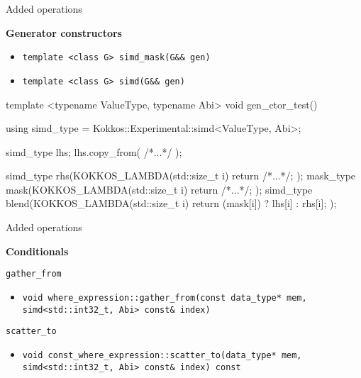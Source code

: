 
\begin{frame}[fragile]{Added operations}

\textbf{Generator constructors}
\begin{itemize}
  \item \texttt{template <class G> simd\_mask(G\&\& gen)}
  \item \texttt{template <class G> simd(G\&\& gen)}
\end{itemize}
\bigskip
\begin{code}[keywords={GeneratorConstructors}]
template <typename ValueType, typename Abi>
void gen_ctor_test() {
  using simd_type = Kokkos::Experimental::simd<ValueType, Abi>;
  
  simd_type lhs;
  lhs.copy_from( /*...*/ );

  simd_type rhs(KOKKOS_LAMBDA(std::size_t i) { return /*...*/; });
  mask_type mask(KOKKOS_LAMBDA(std::size_t i) { return /*...*/; });
  simd_type blend(KOKKOS_LAMBDA(std::size_t i) {
    return (mask[i]) ? lhs[i] : rhs[i]; });
}
\end{code}

\end{frame}


\begin{frame}[fragile]{Added operations}

\textbf{Conditionals}
\vspace{10pt}

\texttt{gather\_from}
\begin{itemize}
  \item \texttt{void where\_expression::gather\_from(const data\_type* mem, simd<std::int32\_t, Abi> const\& index)}
\end{itemize}

\bigskip
\texttt{scatter\_to}
\begin{itemize}
  \item \texttt{void const\_where\_expression::scatter\_to(data\_type* mem, simd<std::int32\_t, Abi> const\& index) const}
\end{itemize}

\end{frame}


